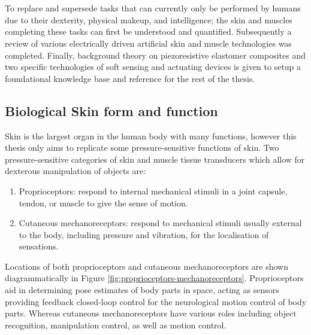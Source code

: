 \chapter{\chapiiname}
\label{chapter2}
To replace and supersede tasks that can currently only be performed by humans due to their dexterity, physical makeup, and intelligence; the skin and muscles completing these tasks can first be understood and quantified. Subsequently a review of various electrically driven artificial skin and muscle technologies was completed. Finally, background theory on piezoresistive elastomer composites and two specific technologies of soft sensing and actuating devices is given to setup a foundational knowledge base and reference for the rest of the thesis. 
    
\section{Biological Skin form and function}
Skin is the largest organ in the human body with many functions, however this thesis only aims to replicate some pressure-sensitive functions of skin. Two pressure-sensitive categories of skin and muscle tissue transducers which allow for dexterous manipulation of objects are:
\begin{enumerate} 
    \item Proprioceptors: respond to internal mechanical stimuli in a joint capsule, tendon, or muscle to give the sense of motion.
    \item Cutaneous mechanoreceptors:  respond to mechanical stimuli usually external to the body, including pressure and vibration, for the localisation of sensations. 
\end{enumerate} 
Locations of both proprioceptors and cutaneous mechanoreceptors are shown diagrammatically in Figure \ref{fig:proprioceptors-mechanoreceptors}. Proprioceptors aid in determining pose estimates of body parts in space, acting as sensors providing feedback closed-loop control for the neurological motion control of body parts. Whereas cutaneous mechanoreceptors have various roles including object recognition, manipulation control, as well as motion control.
